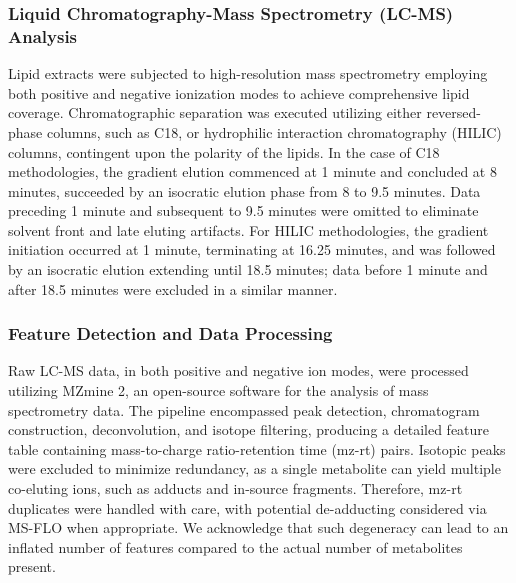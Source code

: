 \documentclass[10pt,letterpaper]{article}
\begin{document}
\subsubsection*{Liquid Chromatography-Mass Spectrometry (LC-MS) Analysis}
Lipid extracts were subjected to high-resolution mass spectrometry employing both positive and negative ionization modes to achieve comprehensive lipid coverage. Chromatographic separation was executed utilizing either reversed-phase columns, such as C18, or hydrophilic interaction chromatography (HILIC) columns, contingent upon the polarity of the lipids. In the case of C18 methodologies, the gradient elution commenced at 1 minute and concluded at 8 minutes, succeeded by an isocratic elution phase from 8 to 9.5 minutes. Data preceding 1 minute and subsequent to 9.5 minutes were omitted to eliminate solvent front and late eluting artifacts. For HILIC methodologies, the gradient initiation occurred at 1 minute, terminating at 16.25 minutes, and was followed by an isocratic elution extending until 18.5 minutes; data before 1 minute and after 18.5 minutes were excluded in a similar manner.

\subsubsection*{Feature Detection and Data Processing}
Raw LC-MS data, in both positive and negative ion modes, were processed utilizing MZmine 2, an open-source software for the analysis of mass spectrometry data. The pipeline encompassed peak detection, chromatogram construction, deconvolution, and isotope filtering, producing a detailed feature table containing mass-to-charge ratio-retention time (mz-rt) pairs. Isotopic peaks were excluded to minimize redundancy, as a single metabolite can yield multiple co-eluting ions, such as adducts and in-source fragments. Therefore, mz-rt duplicates were handled with care, with potential de-adducting considered via MS-FLO when appropriate. We acknowledge that such degeneracy can lead to an inflated number of features compared to the actual number of metabolites present. 
\end{document}
